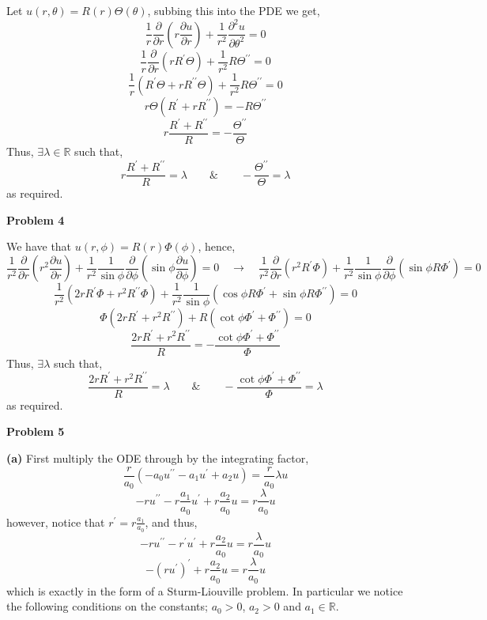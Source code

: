 \documentclass[10pt]{article}
\newcommand{\R}{\mathbb{R}}
\begin{document}
Let $u(r,\theta) = R(r)\Theta(\theta)$, subbing this into the PDE we get,
$$\frac{1}{r} \frac{\partial}{\partial r} \left(r \frac{\partial u}{\partial r}\right) + \frac{1}{r^{2}}\frac{\partial^{2} u}{\partial \theta^{2}} = 0$$
$$\frac{1}{r} \frac{\partial}{\partial r} \left(r R^{\prime}\Theta\right) + \frac{1}{r^{2}}R\Theta^{\prime\prime} = 0$$
$$\frac{1}{r}(R^{\prime}\Theta + rR^{\prime\prime}\Theta) + \frac{1}{r^{2}}R\Theta^{\prime\prime}= 0$$
$$r\Theta(R^{\prime}+ rR^{\prime\prime}) =-R\Theta^{\prime\prime}$$
$$r\frac{R^{\prime} + R^{\prime\prime}}{R} = -\frac{\Theta^{\prime\prime}}{\Theta}$$
Thus, $\exists \lambda \in \R$ such that,
$$r\frac{R^{\prime} + R^{\prime\prime}}{R} = \lambda \hspace{2em} \& \hspace{2em} -\frac{\Theta^{\prime\prime}}{\Theta}=\lambda$$
as required.

\newpage
\textbf{Problem 4}

We have that $u(r,\phi) = R(r)\Phi(\phi)$, hence,
$$\frac{1}{r^{2}}\frac{\partial}{\partial r}\left(r^{2}\frac{\partial u}{\partial r}\right)+\frac{1}{r^{2}}\frac{1}{\sin\phi}\frac{\partial}{\partial \phi}\left(\sin\phi \frac{\partial u}{\partial \phi}\right)=0 \hspace{1em} \to \hspace{1em} \frac{1}{r^{2}}\frac{\partial}{\partial r}\left(r^{2}R^{\prime}\Phi\right)+\frac{1}{r^{2}}\frac{1}{\sin\phi}\frac{\partial}{\partial \phi}\left(\sin\phi R\Phi^{\prime}\right)=0 $$
$$\frac{1}{r^{2}}\left(2rR^{\prime}\Phi + r^{2}R^{\prime\prime}\Phi\right)+\frac{1}{r^{2}}\frac{1}{\sin\phi}\left(\cos\phi R\Phi^{\prime} + \sin\phi R\Phi^{\prime\prime}\right)=0 $$
$$\Phi\left(2rR^{\prime} + r^{2}R^{\prime\prime}\right)+R\left(\cot\phi \Phi^{\prime} + \Phi^{\prime\prime}\right)=0 $$
$$\frac{2rR^{\prime} + r^{2}R^{\prime\prime}}{R} = -\frac{\cot\phi \Phi^{\prime} + \Phi^{\prime\prime}}{\Phi}$$
Thus, $\exists \lambda$ such that,
$$\frac{2rR^{\prime} + r^{2}R^{\prime\prime}}{R} = \lambda \hspace{2em} \& \hspace{2em} -\frac{\cot\phi \Phi^{\prime} + \Phi^{\prime\prime}}{\Phi} = \lambda$$
as required.

\newpage
\textbf{Problem 5}

\textbf{(a)}
First multiply the ODE through by the integrating factor,
$$\frac{r}{a_{0}}(-a_{0}u^{\prime\prime}-a_{1}u^{\prime}+a_{2}u) = \frac{r}{a_{0}}\lambda u$$
$$-ru^{\prime\prime}-r\frac{a_{1}}{a_{0}}u^{\prime}+r\frac{a_{2}}{a_{0}}u = r\frac{\lambda}{a_{0}}u$$
however, notice that $r^{\prime} = r\frac{a_{1}}{a_{0}}$, and thus,
$$-ru^{\prime\prime}-r^{\prime}u^{\prime}+r\frac{a_{2}}{a_{0}}u = r\frac{\lambda}{a_{0}}u$$
$$-(ru^{\prime})^{\prime} + r\frac{a_{2}}{a_{0}}u = r\frac{\lambda}{a_{0}}u$$
which is exactly in the form of a Sturm-Liouville problem. In particular we notice the following conditions on the constants; $a_{0} > 0$, $a_{2} > 0$ and $a_{1} \in \R$.
\end{document}
